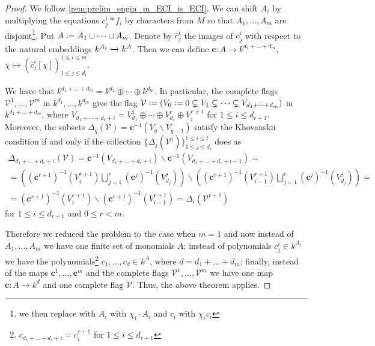 \begin{proof}
    We follow \autoref{rem:prelim_engin_m_ECI_is_ECI}. We can shift $A_i$ by multiplying the equations $c^i_j * f_i$ by characters from $M$ so that $A_1, \dots, A_m$ are disjoint\footnote{we then replace with $A_i$ with $\chi_i \cdot A_i$ and $c_i$ with $\chi_i c_i$}. Put $A \vcentcolon= A_1 \sqcup \dots \sqcup A_m$. Denote by $\hat c^i_j$ the images of $c^i_j$ with respect to the natural embeddings $k^{A_i} \xhookrightarrow{} k^A$. Then we can define $\mathbf c: A \to k^{d_1 + \dots + d_m}$, $\chi \mapsto (\hat c^i_j [\chi])^{1 \le i \le m}_{1 \le j \le d_i}$. 
    
    We have that $k^{d_1 + \dots + d_m} = k^{d_1} \oplus \cdots \oplus k^{d_m}$. In particular, the complete flags $\mathcal V^1, \dots, \mathcal V^m$ in $k^{d_1}, \dots, k^{d_m}$ give the flag $\mathcal V \vcentcolon= (V_0 \vcentcolon= 0 \subsetneq V_1 \subsetneq \dots \subsetneq V_{d_1 + \dots + d_m} )$ in $k^{d_1 + \dots + d_m}$, where $V_{d_1 + \cdots + d_r + i} = V^1_{d_1} \oplus \cdots \oplus V^r_{d_r} \oplus V^{r + 1}_i$ for $1 \le i \le d_{r + 1}$. Moreover, the subsets $\Delta_q (\mathcal V) = \mathbf c^{-1} (V_q \backslash V_{q - 1})$ satisfy the Khovanskii condition if and only if the collection $\{ \Delta_j(\mathcal V^i)\}^{1 \le i \le l}_{1 \le j \le d_i}$ does as 
    \begin{multline*}
    \Delta_{d_1 + \dots + d_r + i}(\mathcal V) = \mathbf c^{-1} (V_{d_1 + \dots + d_r + i}) \backslash \mathbf c^{-1} (V_{d_1 + \dots + d_r + i - 1}) = \\
    = \left((\mathbf c^{r + 1})^{-1} (V^{r + 1}_i) \bigcup_{j = 1}^r (\mathbf c^j)^{-1} (V^j_{d_j}) \right) \backslash \left((\mathbf c^{r + 1})^{-1} (V^{r + 1}_{i - 1}) \bigcup_{j = 1}^r (\mathbf c^j)^{-1} (V^j_{d_j}) \right) = \\
    = (\mathbf c^{r + 1})^{-1}(V^{r + 1}_i) \backslash (\mathbf c^{r + 1})^{-1} (V^{r + 1}_{i - 1}) = \Delta_i(\mathcal V^{r + 1})
    \end{multline*}
    for $1 \le i \le d_{r + 1}$ and $0 \le r < m$.
    
    Therefore we reduced the problem to the case when $m = 1$ and now instead of $A_1, \dots, A_m$ we have one finite set of monomials $A$; instead of polynomials $c^i_j \in k^{A_i}$ we have the polynomials\footnote{$c_{d_1 + \dots + d_r + i} = c^{r + 1}_i$ for $1 \le i \le d_{r + 1}$} $c_1, \dots, c_d \in k^A$, where $d = d_1 + \dots + d_m$; finally, instead of the maps $\mathbf c^1, \dots, \mathbf c^m$ and the complete flags $\mathcal V^1, \dots, \mathcal V^m$ we have one map $\mathbf c: A \to k^d$ and one complete flag $\mathcal V$. Thus, the above theorem applies.
\end{proof}

